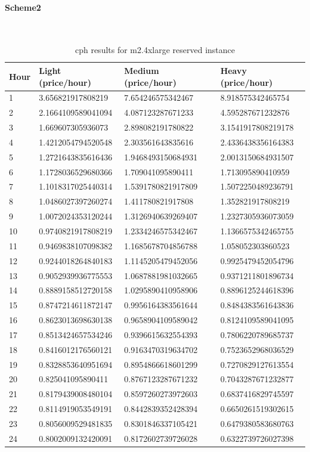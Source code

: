 \documentclass[]{final_report}
\newcommand{\myparagraph}[1]{\paragraph{#1}\mbox{}\\}
\begin{document}
\myparagraph{Scheme2}

\begin{table}[h]
\begin{center}
    \begin{tabular}{| l | l | l | l |}
    \hline
    \textbf{Hour} & \textbf{Light (price/hour)} & \textbf{Medium (price/hour)} & \textbf{Heavy (price/hour)} \\
    \hline
1&3.656821917808219&7.654246575342467&8.918575342465754\\ 
 \hline 
2&2.1664109589041094&4.087123287671233&4.595287671232876\\ 
 \hline 
3&1.669607305936073&2.898082191780822&3.1541917808219178\\ 
 \hline 
4&1.4212054794520548&2.303561643835616&2.4336438356164383\\ 
 \hline 
5&1.2721643835616436&1.9468493150684931&2.0013150684931507\\ 
 \hline 
6&1.1728036529680366&1.709041095890411&1.713095890410959\\ 
 \hline 
7&1.1018317025440314&1.5391780821917809&1.5072250489236791\\ 
 \hline 
8&1.0486027397260274&1.411780821917808&1.352821917808219\\ 
 \hline 
9&1.0072024353120244&1.3126940639269407&1.2327305936073059\\ 
 \hline 
10&0.9740821917808219&1.2334246575342467&1.1366575342465755\\ 
 \hline 
11&0.9469838107098382&1.1685678704856788&1.058052303860523\\ 
 \hline 
12&0.9244018264840183&1.1145205479452056&0.9925479452054796\\ 
 \hline 
13&0.9052939936775553&1.0687881981032665&0.9371211801896734\\ 
 \hline 
14&0.8889158512720158&1.0295890410958906&0.8896125244618396\\ 
 \hline 
15&0.8747214611872147&0.9956164383561644&0.8484383561643836\\ 
 \hline 
16&0.8623013698630138&0.9658904109589042&0.8124109589041095\\ 
 \hline 
17&0.8513424657534246&0.9396615632554393&0.7806220789685737\\ 
 \hline 
18&0.8416012176560121&0.9163470319634702&0.7523652968036529\\ 
 \hline 
19&0.8328853640951694&0.8954866618601299&0.7270829127613554\\ 
 \hline 
20&0.825041095890411&0.8767123287671232&0.7043287671232877\\ 
 \hline 
21&0.8179439008480104&0.8597260273972603&0.6837416829745597\\ 
 \hline 
22&0.8114919053549191&0.8442839352428394&0.6650261519302615\\ 
 \hline 
23&0.8056009529481835&0.8301846337105421&0.6479380583680763\\ 
 \hline 
24&0.8002009132420091&0.8172602739726028&0.6322739726027398 \\
 \hline 
    \end{tabular}
\end{center}
\caption{cph results for m2.4xlarge reserved instance}
\label{tab:cph:scheme2}
\end{table}
\end{document}
